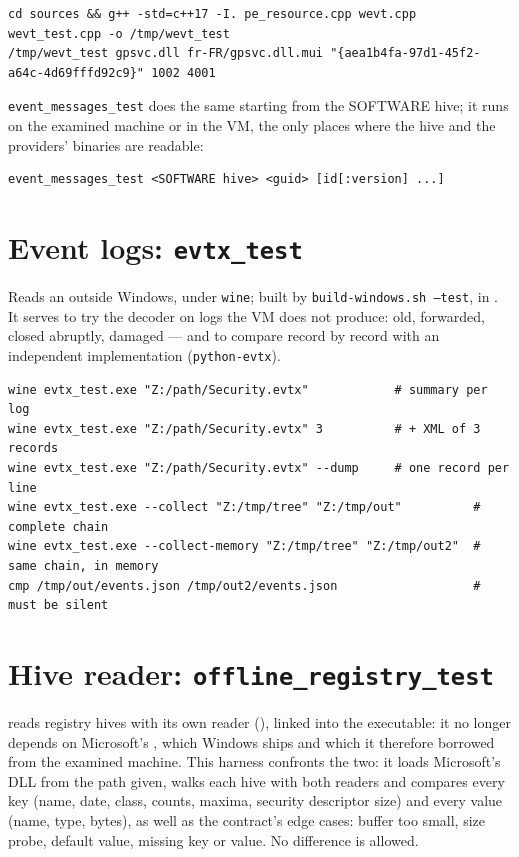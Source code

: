 \documentclass[11pt,a4paper,oneside]{report}
\begin{document}
\begin{lstlisting}
cd sources && g++ -std=c++17 -I. pe_resource.cpp wevt.cpp wevt_test.cpp -o /tmp/wevt_test
/tmp/wevt_test gpsvc.dll fr-FR/gpsvc.dll.mui "{aea1b4fa-97d1-45f2-a64c-4d69fffd92c9}" 1002 4001
\end{lstlisting}

\texttt{event\_messages\_test} does the same starting from the SOFTWARE hive; it
runs on the examined machine or in the VM, the only places where the hive and
the providers' binaries are readable:

\begin{lstlisting}
event_messages_test <SOFTWARE hive> <guid> [id[:version] ...]
\end{lstlisting}

\section{Event logs: \texttt{evtx\_test}}

Reads an  outside Windows, under \texttt{wine}; built by
\texttt{build-windows.sh --test}, in . It serves to try
the decoder on logs the VM does not produce: old, forwarded, closed abruptly,
damaged — and to compare record by record with an independent implementation
(\texttt{python-evtx}).

\begin{lstlisting}
wine evtx_test.exe "Z:/path/Security.evtx"            # summary per log
wine evtx_test.exe "Z:/path/Security.evtx" 3          # + XML of 3 records
wine evtx_test.exe "Z:/path/Security.evtx" --dump     # one record per line
wine evtx_test.exe --collect "Z:/tmp/tree" "Z:/tmp/out"          # complete chain
wine evtx_test.exe --collect-memory "Z:/tmp/tree" "Z:/tmp/out2"  # same chain, in memory
cmp /tmp/out/events.json /tmp/out2/events.json                   # must be silent
\end{lstlisting}


\section{Hive reader: \texttt{offline\_registry\_test}}

\wac{} reads registry hives with its own reader
(), linked into the executable: it no longer
depends on Microsoft's , which Windows ships and which it
therefore borrowed from the examined machine. This harness confronts the two:
it loads Microsoft's DLL from the path given, walks each hive with both readers
and compares every key (name, date, class, counts, maxima, security descriptor
size) and every value (name, type, bytes), as well as the contract's edge
cases: buffer too small, size probe, default value, missing key or value. No
difference is allowed.
\end{document}
